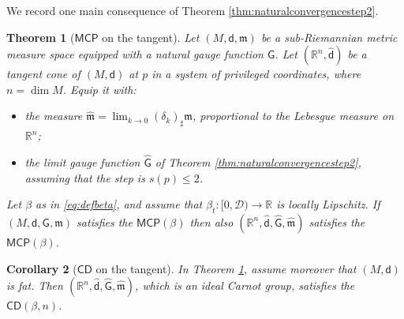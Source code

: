 \documentclass[11pt,a4paper]{article}
\theoremstyle{plain}
\newtheorem{theorem}{Theorem}[section]
\newtheorem{corollary}[theorem]{Corollary}
\theoremstyle{definition}
\theoremstyle{remark}
\numberwithin{equation}{section}
\newcommand{\R}{\mathbb{R}} %
\newcommand{\CD}{\mathsf{CD}}
\newcommand{\MCP}{\mathsf{MCP}}
\newcommand{\cD}{\mathcal{D}}
\newcommand{\mm}{\mathfrak m}
\newcommand{\sfd}{\mathsf d}
\newcommand{\sfG}{\mathsf G}
\begin{document}
We record one main consequence of Theorem \ref{thm:naturalconvergencestep2}.

\begin{theorem}[$\MCP$ on the tangent]\label{t:MCPfortangent}
Let $(M,\sfd,\mm)$ be a sub-Riemannian metric measure space equipped with a natural gauge function $\sfG$. Let $(\R^n,\hat{\sfd})$ be a tangent cone of $(M,\sfd)$ at $p$ in a system of privileged coordinates, where $n= \dim M$. Equip it with:
\begin{itemize}
\item the measure $\hat{\mm}=\lim_{k\to 0}(\delta_{k})_\sharp \mm$, proportional to the Lebesgue measure on $\R^n$;
\item the limit gauge function $\hat{\sfG}$ of Theorem \ref{thm:naturalconvergencestep2}, assuming that the step is $s(p)\leq 2$.
\end{itemize}
Let $\beta$ as in \eqref{eq:defbeta}, and assume that $\beta_t : [0,\cD)\to \R$ is locally Lipschitz. If $(M,\sfd,\sfG,\mm)$ satisfies the $\MCP(\beta)$ then also $(\R^n,\hat{\sfd},\hat{\sfG},\hat{\mm})$ satisfies the $\MCP(\beta)$.
\end{theorem}
\begin{corollary}[$\CD$ on the tangent]\label{c:CDfortangent}
In Theorem \ref{t:MCPfortangent}, assume moreover that $(M,\sfd)$ is fat. Then $(\R^n,\hat{\sfd},\hat{\sfG},\hat{\mm})$, which is an ideal Carnot group, satisfies the $\CD(\beta,n)$.
\end{corollary}
\end{document}
